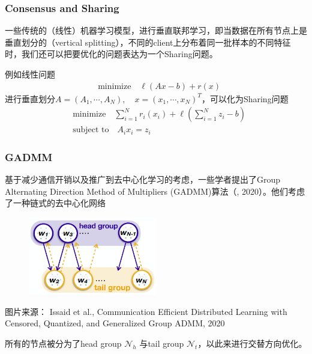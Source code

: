 \begin{frame}
\frametitle{Consensus and Sharing}

一些传统的（线性）机器学习模型，进行垂直联邦学习，即当数据在所有节点上是垂直划分的（vertical splitting），不同的client上分布着同一批样本的不同特征时，我们还可以把要优化的问题表达为一个Sharing问题。

\pause

例如线性问题
\begin{align*}
    & \text{minimize} \quad \ell (Ax - b) + r(x)
\end{align*}
进行垂直划分$A = (A_1, \cdots, A_N), \quad x = (x_1, \cdots, x_N)^T$，可以化为Sharing问题
\begin{align*}
    & \text{minimize} \quad \sum\limits_{i=1}^N r_i(x_i) + \ell(\sum\limits_{i=1}^N z_i - b) \\
    & \text{subject to} \quad A_ix_i = z_i
\end{align*}

\end{frame}


\begin{frame}
\frametitle{GADMM}

基于减少通信开销以及推广到去中心化学习的考虑，一些学者提出了Group Alternating Direction Method of Multipliers (GADMM)算法（\cite{elgabli2020gadmm}, 2020）。他们考虑了一种链式的去中心化网络
\begin{figure}[H]
    \centering
    \includegraphics[width=0.5\textwidth,keepaspectratio]{images/GADMM.png}
\end{figure}
{\scriptsize 图片来源：\cite{issaid2020cq-ggadmm} Issaid et al., Communication Efficient Distributed Learning with Censored, Quantized, and Generalized Group ADMM, 2020}

所有的节点被分为了head group $\mathcal{N}_h$ 与tail group $\mathcal{N}_t$，以此来进行交替方向优化。

\end{frame}


